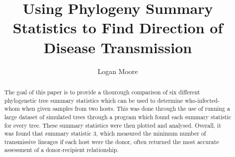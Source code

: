 \documentclass[final,5p,times,twocolumn,authoryear]{elsarticle}
\begin{document}
\begin{frontmatter}



\title{Using Phylogeny Summary Statistics to Find Direction of Disease Transmission}


\author[first]{Logan Moore}

\begin{abstract}
The goal of this paper is to provide a thourough comparison of six different phylogenetic tree summary statistics which can be used to determine who-infected-whom when given samples from two hosts. This was done through the use of running a large dataset of simulated trees through a program which found each summary statistic for every tree. These summary statistics were then plotted and analysed. Overall, it was found that summary statistic 3, which measured the minimum number of transmissive lineages if each host were the donor, often returned the most accurate assessment of a donor-recipient relationship.
\end{abstract}


\end{frontmatter}
\end{document}
